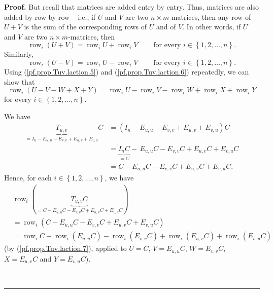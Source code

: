 \documentclass[numbers=enddot,12pt,final,onecolumn,notitlepage]{scrartcl}%
\theoremstyle{definition}
\newenvironment{proof}[1][Proof]{\noindent\textbf{#1.} }{\ \rule{0.5em}{0.5em}}
\begin{document}
\begin{proof}
But recall that matrices are added entry by entry. Thus, matrices are also
added by row by row -- i.e., if $U$ and $V$ are two $n\times m$-matrices, then
any row of $U+V$ is the sum of the corresponding rows of $U$ and of $V$. In
other words, if $U$ and $V$ are two $n\times m$-matrices, then%
\begin{equation}
\operatorname*{row}\nolimits_{i}\left(  U+V\right)  =\operatorname*{row}%
\nolimits_{i}U+\operatorname*{row}\nolimits_{i}V\ \ \ \ \ \ \ \ \ \ \text{for
every }i\in\left\{  1,2,\ldots,n\right\}  . \label{pf.prop.Tuv.laction.5}%
\end{equation}
Similarly,%
\begin{equation}
\operatorname*{row}\nolimits_{i}\left(  U-V\right)  =\operatorname*{row}%
\nolimits_{i}U-\operatorname*{row}\nolimits_{i}V\ \ \ \ \ \ \ \ \ \ \text{for
every }i\in\left\{  1,2,\ldots,n\right\}  . \label{pf.prop.Tuv.laction.6}%
\end{equation}
Using (\ref{pf.prop.Tuv.laction.5}) and (\ref{pf.prop.Tuv.laction.6})
repeatedly, we can show that%
\begin{equation}
\operatorname*{row}\nolimits_{i}\left(  U-V-W+X+Y\right)  =\operatorname*{row}%
\nolimits_{i}U-\operatorname*{row}\nolimits_{i}V-\operatorname*{row}%
\nolimits_{i}W+\operatorname*{row}\nolimits_{i}X+\operatorname*{row}%
\nolimits_{i}Y \label{pf.prop.Tuv.laction.7}%
\end{equation}
for every $i\in\left\{  1,2,\ldots,n\right\}  $.

We have%
\begin{align*}
\underbrace{T_{u,v}}_{=I_{n}-E_{u,u}-E_{v,v}+E_{u,v}+E_{v,u}}C  &  =\left(
I_{n}-E_{u,u}-E_{v,v}+E_{u,v}+E_{v,u}\right)  C\\
&  =\underbrace{I_{n}C}_{=C}-\,E_{u,u}C-E_{v,v}C+E_{u,v}C+E_{v,u}C\\
&  =C-E_{u,u}C-E_{v,v}C+E_{u,v}C+E_{v,u}C.
\end{align*}
Hence, for each $i\in\left\{  1,2,\ldots,n\right\}  $, we have%
\begin{align}
&  \operatorname*{row}\nolimits_{i}\left(  \underbrace{T_{u,v}C}%
_{=C-E_{u,u}C-E_{v,v}C+E_{u,v}C+E_{v,u}C}\right) \nonumber\\
&  =\operatorname*{row}\nolimits_{i}\left(  C-E_{u,u}C-E_{v,v}C+E_{u,v}%
C+E_{v,u}C\right) \nonumber\\
&  =\operatorname*{row}\nolimits_{i}C-\operatorname*{row}\nolimits_{i}\left(
E_{u,u}C\right)  -\operatorname*{row}\nolimits_{i}\left(  E_{v,v}C\right)
+\operatorname*{row}\nolimits_{i}\left(  E_{u,v}C\right)  +\operatorname*{row}%
\nolimits_{i}\left(  E_{v,u}C\right)  \label{pf.prop.Tuv.laction.9}%
\end{align}
(by (\ref{pf.prop.Tuv.laction.7}), applied to $U=C$, $V=E_{u,u}C$,
$W=E_{v,v}C$, $X=E_{u,v}C$ and $Y=E_{v,u}C$).


\end{proof}
\end{document}
